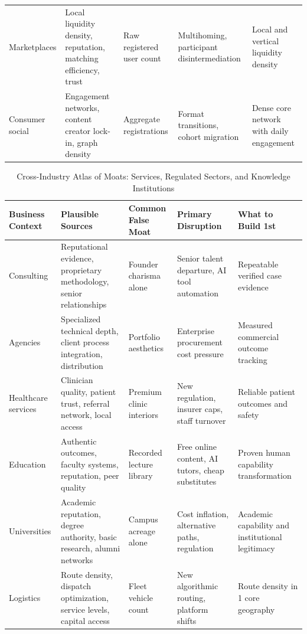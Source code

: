 \begin{table}[t]
\begin{tabularx}{\textwidth}{p{2.3cm} p{3.2cm} p{2.4cm} p{2.6cm} X}
\addlinespace[3pt]
Marketplaces & Local liquidity density, reputation, matching efficiency, trust & Raw registered user count & Multihoming, participant disintermediation & Local and vertical liquidity density \\
\addlinespace[3pt]
Consumer social & Engagement networks, content creator lock-in, graph density & Aggregate registrations & Format transitions, cohort migration & Dense core network with daily engagement \\
\bottomrule
\end{tabularx}
\end{table}

\begin{table}[t]
\centering
\footnotesize
\caption{Cross-Industry Atlas of Moats: Services, Regulated Sectors, and Knowledge Institutions}
\label{tab:atlas_services_knowledge}
\begin{tabularx}{\textwidth}{p{2.3cm} p{3.2cm} p{2.4cm} p{2.6cm} X}
\toprule
\textbf{Business Context} & \textbf{Plausible Sources} & \textbf{Common False Moat} & \textbf{Primary Disruption} & \textbf{What to Build 1st} \\
\midrule
Consulting & Reputational evidence, proprietary methodology, senior relationships & Founder charisma alone & Senior talent departure, AI tool automation & Repeatable verified case evidence \\
\addlinespace[3pt]
Agencies & Specialized technical depth, client process integration, distribution & Portfolio aesthetics & Enterprise procurement cost pressure & Measured commercial outcome tracking \\
\addlinespace[3pt]
Healthcare services & Clinician quality, patient trust, referral network, local access & Premium clinic interiors & New regulation, insurer caps, staff turnover & Reliable patient outcomes and safety \\
\addlinespace[3pt]
Education & Authentic outcomes, faculty systems, reputation, peer quality & Recorded lecture library & Free online content, AI tutors, cheap substitutes & Proven human capability transformation \\
\addlinespace[3pt]
Universities & Academic reputation, degree authority, basic research, alumni networks & Campus acreage alone & Cost inflation, alternative paths, regulation & Academic capability and institutional legitimacy \\
\addlinespace[3pt]
Logistics & Route density, dispatch optimization, service levels, capital access & Fleet vehicle count & New algorithmic routing, platform shifts & Route density in 1 core geography \\

\end{tabularx}
\end{table}
